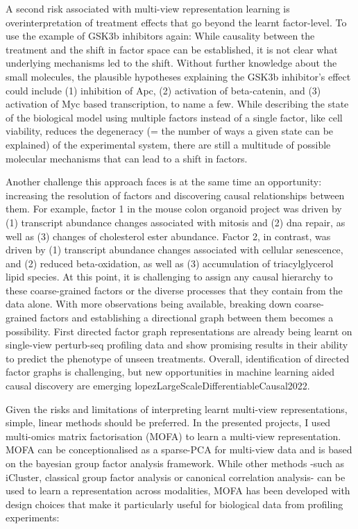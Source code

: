 \begin{flushleft}
A second risk associated with multi-view representation learning is overinterpretation of treatment effects that go beyond the learnt factor-level. To use the example of GSK3b inhibitors again: While causality between the treatment and the shift in factor space can be established, it is not clear what underlying mechanisms led to the shift. Without further knowledge about the small molecules, the plausible hypotheses explaining the GSK3b inhibitor's effect could include (1) inhibition of Apc, (2) activation of beta-catenin, and (3) activation of Myc based transcription, to name a few. While describing the state of the biological model using multiple factors instead of a single factor, like cell viability, reduces the degeneracy (= the number of ways a given state can be explained) of the experimental system, there are still a multitude of possible molecular mechanisms that can lead to a shift in factors.
\bigbreak

Another challenge this approach faces is at the same time an opportunity: increasing the resolution of factors and discovering causal relationships between them. For example, factor 1 in the mouse colon organoid project was driven by (1) transcript abundance changes associated with mitosis and (2) dna repair, as well as (3) changes of cholesterol ester abundance. Factor 2, in contrast, was driven by (1) transcript abundance changes associated with cellular senescence, and (2) reduced beta-oxidation, as well as (3) accumulation of triacylglycerol lipid species. At this point, it is challenging to assign any causal hierarchy to these coarse-grained factors or the diverse processes that they contain from the data alone. With more observations being available, breaking down coarse-grained factors and establishing a directional graph between them becomes a possibility. First directed factor graph representations are already being learnt on single-view perturb-seq profiling data and show promising results in their ability to predict the phenotype of unseen treatments. Overall, identification of directed factor graphs is challenging, but new opportunities in machine learning aided causal discovery are emerging lopezLargeScaleDifferentiableCausal2022.
\bigbreak

Given the risks and limitations of interpreting learnt multi-view representations, simple, linear methods should be preferred. In the presented projects, I used multi-omics matrix factorisation (MOFA) to learn a multi-view representation. MOFA can be conceptionalised as a sparse-PCA for multi-view data and is based on the bayesian group factor analysis framework. While other methods -such as iCluster, classical group factor analysis or canonical correlation analysis- can be used to learn a representation across modalities, MOFA has been developed with design choices that make it particularly useful for biological data from profiling experiments:
\bigbreak


\end{flushleft}
